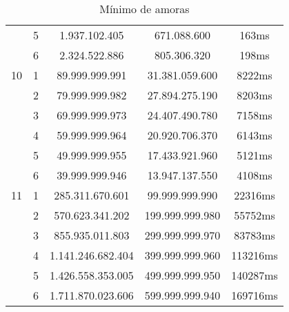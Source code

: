 \documentclass[12pt]{article}
\begin{document}
\begin{table}[H]
\begin{tabular}{|c|c|c|c|c|}
\cline{2-5}
& 5 & 1.937.102.405 & 671.088.600 & 163ms \\
\cline{2-5}
& 6 & 2.324.522.886 & 805.306.320 & 198ms \\
\hline
10 & 1 & 89.999.999.991 & 31.381.059.600 & 8222ms \\
\cline{2-5}
& 2 & 79.999.999.982 & 27.894.275.190 & 8203ms \\
\cline{2-5}
& 3 & 69.999.999.973 & 24.407.490.780 & 7158ms \\
\cline{2-5}
& 4 & 59.999.999.964 & 20.920.706.370 & 6143ms \\
\cline{2-5}
& 5 & 49.999.999.955 & 17.433.921.960 & 5121ms \\
\cline{2-5}
& 6 & 39.999.999.946 & 13.947.137.550 & 4108ms \\
\hline
11 & 1 & 285.311.670.601 & 99.999.999.990 & 22316ms \\
\cline{2-5}
& 2 & 570.623.341.202 & 199.999.999.980 & 55752ms \\
\cline{2-5}
& 3 & 855.935.011.803 & 299.999.999.970 & 83783ms \\
\cline{2-5}
& 4 & 1.141.246.682.404 & 399.999.999.960 & 113216ms \\
\cline{2-5}
& 5 & 1.426.558.353.005 & 499.999.999.950 & 140287ms \\
\cline{2-5}
& 6 & 1.711.870.023.606 & 599.999.999.940 & 169716ms \\
\hline

\end{tabular}
\label{Tabela2}
\caption{Mínimo de amoras}

\end{table}
\end{document}
